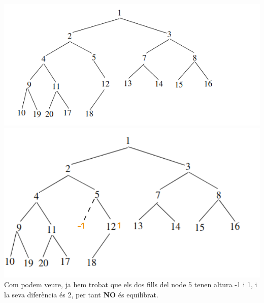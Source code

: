 \documentclass[11pt]{article}
\begin{document}
    \includegraphics[scale=0.4]{imgs/a2} \includegraphics[scale=0.25]{imgs/a2neq}\\

    Com podem veure, ja hem trobat que els dos fills del node 5 tenen altura -1 i 1, i la seva diferència és 2, per tant \textbf{NO} és equilibrat.\\
\end{document}
